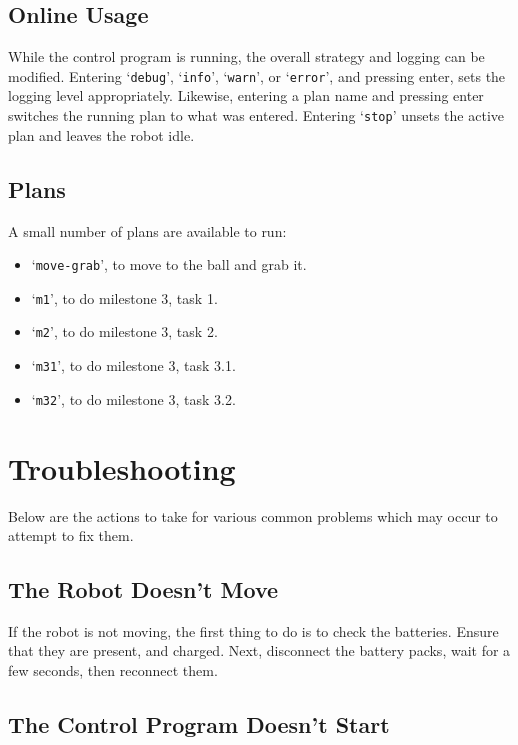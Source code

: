 \documentclass[a4paper]{scrartcl}
\begin{document}
\subsection{Online Usage}

While the control program is running, the overall strategy and logging can be
modified. Entering `\texttt{debug}', `\texttt{info}', `\texttt{warn}', or
`\texttt{error}', and pressing enter, sets the logging level appropriately.
Likewise, entering a plan name and pressing enter switches the running plan to
what was entered. Entering `\texttt{stop}' unsets the active plan and leaves
the robot idle.

\subsection{Plans}

A small number of plans are available to run:

\begin{itemize}
    \item `\texttt{move-grab}', to move to the ball and grab it.
    \item `\texttt{m1}', to do milestone 3, task 1.
    \item `\texttt{m2}', to do milestone 3, task 2.
    \item `\texttt{m31}', to do milestone 3, task 3.1.
    \item `\texttt{m32}', to do milestone 3, task 3.2.
\end{itemize}

%

\section{Troubleshooting}

Below are the actions to take for various common problems which may occur to
attempt to fix them.

\subsection{The Robot Doesn't Move}

If the robot is not moving, the first thing to do is to check the batteries.
Ensure that they are present, and charged. Next, disconnect the battery packs,
wait for a few seconds, then reconnect them.

\subsection{The Control Program Doesn't Start}
\end{document}
